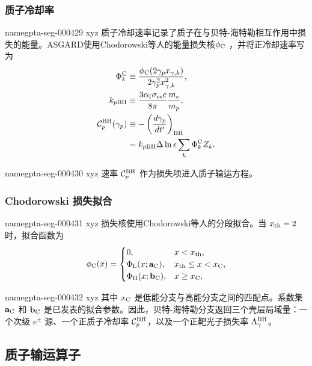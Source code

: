 \documentclass[twocolumn]{aastex702}
\makeatletter
\providecommand{\gptareaderanchor}[1]{\pdfdest name{#1} xyz}%
\providecommand{\gptareaderanchor}[1]{\special{pdf:dest (#1) [ @thispage /XYZ @xpos @ypos null ]}}%
\makeatother
\begin{document}
\subsubsection{质子冷却率}


\gptareaderanchor{gpta-seg-000429}%
质子冷却速率记录了质子在与贝特-海特勒相互作用中损失的能量。ASGARD使用Chodorowski等人的能量损失核\(\phi_{\rm C}\) \citep{Chodorowski1992}，并将正冷却速率写为
\begin{equation}
\begin{aligned}
\Phi_k^{\rm C}
&\equiv \frac{\phi_{\rm C}(2\gamma_px_{\gamma,k})}
{2\gamma_p^2x_{\gamma,k}^2},\\
k_{p{\rm BH}}&\equiv
\frac{3\alpha_{\rm f}\sigma_{\rm es}c}{8\pi}\frac{m_e}{m_p},\\
\mathcal{C}_p^{\rm BH}(\gamma_p)
&\equiv -\left(\frac{d\gamma_p}{dt'}\right)_{\rm BH}\\
&=k_{p{\rm BH}}\Delta\ln\epsilon
\sum_k\Phi_k^{\rm C}Z_k.
\end{aligned}
\end{equation}

\gptareaderanchor{gpta-seg-000430}%
速率 \(\mathcal{C}_p^{\rm BH}\) 作为损失项进入质子输运方程。

\subsubsection{Chodorowski 损失拟合}


\gptareaderanchor{gpta-seg-000431}%
损失核使用Chodorowski等人的分段拟合。当 \(x_{\rm th}=2\) 时，拟合函数为
\begin{equation}
\phi_{\rm C}(x)=
\begin{cases}
0, & x<x_{\rm th},\\
\Phi_{\rm L}(x;\mathbf{a}_{\rm C}), & x_{\rm th}\le x<x_{\rm C},\\
\Phi_{\rm H}(x;\mathbf{b}_{\rm C}), & x\ge x_{\rm C},
\end{cases}
\end{equation}

\gptareaderanchor{gpta-seg-000432}%
其中 \(x_{\rm C}\) 是低能分支与高能分支之间的匹配点。系数集 \(\mathbf{a}_{\rm C}\) 和 \(\mathbf{b}_{\rm C}\) 是已发表的拟合参数。因此，贝特-海特勒分支返回三个壳层局域量：一个次级 \(e^\pm\) 源、一个正质子冷却率 \(\mathcal{C}_p^{\rm BH}\)，以及一个正靶光子损失率 \(\Lambda_{\gamma}^{\rm BH}\)。

\subsection{质子输运算子}
\end{document}
